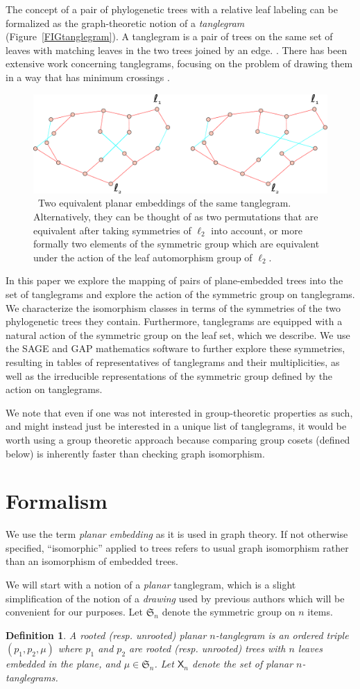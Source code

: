 \documentclass{amsart}
\newtheorem{definition}{Definition}
\newcommand{\fS}{\mathfrak S}
\newcommand{\pairing}{\mu}
\newcommand{\ptangle}{\mathsf{X}}
\newcommand{\arxiv}[1]{#1}
\newcommand{\FIGtanglegram}{\
\label{FIGtanglegram}
\begin{figure}
  \arxiv{\includegraphics[width=5in]{figures/relabeling-example}}
\caption{\
  Two equivalent planar embeddings of the same tanglegram.
  Alternatively, they can be thought of as two permutations that are equivalent after taking symmetries of $\ell_2$ into account, or more formally two elements of the symmetric group which are equivalent under the action of the leaf automorphism group of $\ell_2$.
}
\end{figure}
}
\begin{document}
The concept of a pair of phylogenetic trees with a relative leaf labeling can be formalized as the graph-theoretic notion of a \emph{tanglegram} (Figure~\ref{FIGtanglegram}).
A tanglegram is a pair of trees on the same set of leaves with matching leaves in the two trees joined by an edge. \cite{Venkatachalam2010-zh}.
There has been extensive work concerning tanglegrams, focusing on the problem of drawing them in a way that has minimum crossings \cite{Buchin2008-lc,Lozano2008-tp,Bansal2009-ni,Bocker2009-xl,Fernau2010-an,Venkatachalam2010-zh}.
\FIGtanglegram

In this paper we explore the mapping of pairs of plane-embedded trees into the set of tanglegrams and explore the action of the symmetric group on tanglegrams.
We characterize the isomorphism classes in terms of the symmetries of the two phylogenetic trees they contain.
Furthermore, tanglegrams are equipped with a natural action of the symmetric group on the leaf set, which we describe.
We use the SAGE \cite{SteinJoyner2005} and GAP \cite{GAP4} mathematics software to further explore these symmetries, resulting in tables of representatives of tanglegrams and their multiplicities, as well as the irreducible representations of the symmetric group defined by the action on tanglegrams.

We note that even if one was not interested in group-theoretic properties as such, and might instead just be interested in a unique list of tanglegrams, it would be worth using a group theoretic approach because comparing group cosets (defined below) is inherently faster than checking graph isomorphism.

\section{Formalism}
We use the term \emph{planar embedding} as it is used in graph theory.
If not otherwise specified, ``isomorphic'' applied to trees refers to usual graph isomorphism rather than an isomorphism of embedded trees.

We will start with a notion of a \emph{planar} tanglegram, which is a slight simplification of the notion of a \emph{drawing} used by previous authors \cite{Venkatachalam2010-zh} which will be convenient for our purposes.
Let $\fS_n$ denote the symmetric group on $n$ items.
\begin{definition}
\label{def:ptanglegram}
A rooted (resp. unrooted) \emph{planar $n$-tanglegram} is an ordered triple $(p_1, p_2, \pairing)$ where $p_1$ and $p_2$ are rooted (resp. unrooted) trees with $n$ leaves embedded in the plane, and $\pairing \in \fS_n$.
Let $\ptangle_n$ denote the set of planar $n$-tanglegrams.
\end{definition}
\end{document}
